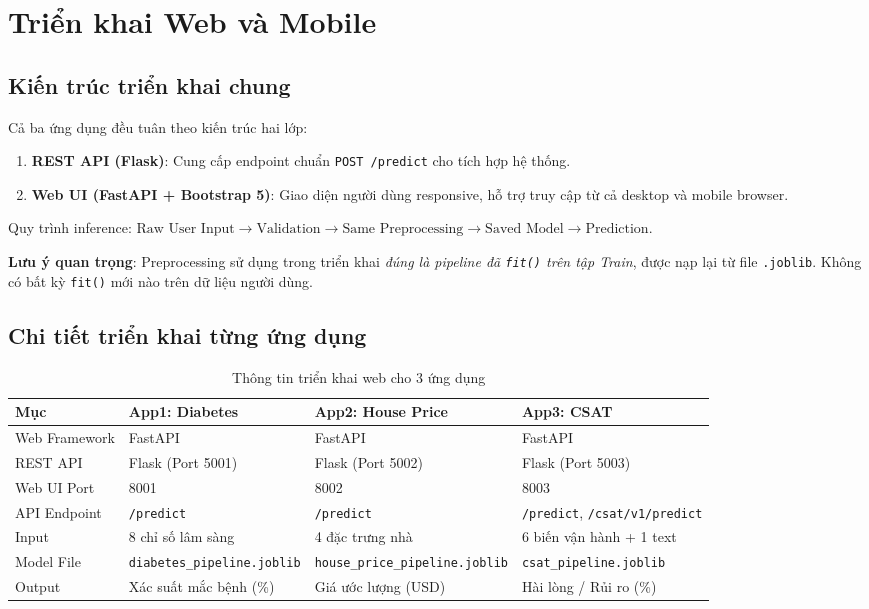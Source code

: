 \documentclass[12pt, a4paper]{article}
\begin{document}
\section{Triển khai Web và Mobile}

\subsection{Kiến trúc triển khai chung}

Cả ba ứng dụng đều tuân theo kiến trúc hai lớp:
\begin{enumerate}
    \item \textbf{REST API (Flask)}: Cung cấp endpoint chuẩn \texttt{POST /predict} cho tích hợp hệ thống.
    \item \textbf{Web UI (FastAPI + Bootstrap 5)}: Giao diện người dùng responsive, hỗ trợ truy cập từ cả desktop và mobile browser.
\end{enumerate}

Quy trình inference: $\text{Raw User Input} \to \text{Validation} \to \text{Same Preprocessing} \to \text{Saved Model} \to \text{Prediction}$.

\textbf{Lưu ý quan trọng}: Preprocessing sử dụng trong triển khai \textit{đúng là pipeline đã \texttt{fit()} trên tập Train}, được nạp lại từ file \texttt{.joblib}. Không có bất kỳ \texttt{fit()} mới nào trên dữ liệu người dùng.

\subsection{Chi tiết triển khai từng ứng dụng}

\begin{table}[H]
\centering
\caption{Thông tin triển khai web cho 3 ứng dụng}
\label{tab:deployment}
\small
\begin{tabularx}{\textwidth}{|l|X|X|X|}
\hline
\textbf{Mục} & \textbf{App1: Diabetes} & \textbf{App2: House Price} & \textbf{App3: CSAT} \\
\hline
Web Framework & FastAPI & FastAPI & FastAPI \\
\hline
REST API & Flask (Port 5001) & Flask (Port 5002) & Flask (Port 5003) \\
\hline
Web UI Port & 8001 & 8002 & 8003 \\
\hline
API Endpoint & \texttt{/predict} & \texttt{/predict} & \texttt{/predict}, \texttt{/csat/v1/predict} \\
\hline
Input & 8 chỉ số lâm sàng & 4 đặc trưng nhà & 6 biến vận hành + 1 text \\
\hline
Model File & \texttt{diabetes\_pipeline.joblib} & \texttt{house\_price\_pipeline.joblib} & \texttt{csat\_pipeline.joblib} \\
\hline
Output & Xác suất mắc bệnh (\%) & Giá ước lượng (USD) & Hài lòng / Rủi ro (\%) \\
\hline
\end{tabularx}
\end{table}
\end{document}
